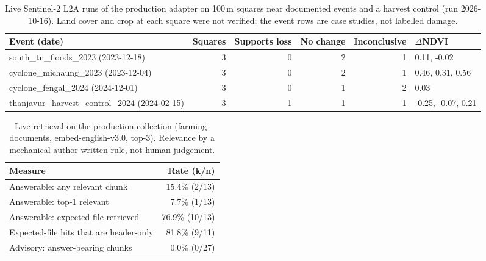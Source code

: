 \begin{table}[t]
\caption{Live Sentinel-2 L2A runs of the production adapter on 100\,m squares near documented events and a harvest control (run 2026-10-16). Land cover and crop at each square were not verified; the event rows are case studies, not labelled damage.}
\label{tab:satellitelive}
\centering
\begin{tabular}{lrrrrl}
\hline
Event (date) & Squares & Supports loss & No change & Inconclusive & $\Delta$NDVI \\
\hline
south\_tn\_floods\_2023 (2023-12-18) & 3 & 0 & 2 & 1 & 0.11, -0.02 \\
cyclone\_michaung\_2023 (2023-12-04) & 3 & 0 & 2 & 1 & 0.46, 0.31, 0.56 \\
cyclone\_fengal\_2024 (2024-12-01) & 3 & 0 & 1 & 2 & 0.03 \\
thanjavur\_harvest\_control\_2024 (2024-02-15) & 3 & 1 & 1 & 1 & -0.25, -0.07, 0.21 \\
\hline
\end{tabular}
\end{table}

\begin{table}[t]
\caption{Live retrieval on the production collection (farming-documents, embed-english-v3.0, top-3). Relevance by a mechanical author-written rule, not human judgement.}
\label{tab:rag}
\centering
\begin{tabular}{lr}
\hline
Measure & Rate (k/n) \\
\hline
Answerable: any relevant chunk & 15.4\% (2/13) \\
Answerable: top-1 relevant & 7.7\% (1/13) \\
Answerable: expected file retrieved & 76.9\% (10/13) \\
Expected-file hits that are header-only & 81.8\% (9/11) \\
Advisory: answer-bearing chunks & 0.0\% (0/27) \\
\hline
\end{tabular}
\end{table}



